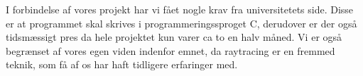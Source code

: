 
I forbindelse af vores projekt har vi fået nogle krav fra universitetets side. Disse er at programmet skal skrives i programmeringssproget C, derudover er der også tidsmæssigt pres da hele projektet kun varer ca to en halv måned. 
Vi er også begrænset af vores egen viden indenfor emnet, da raytracing er en fremmed teknik, som få af os har haft tidligere erfaringer med. 
